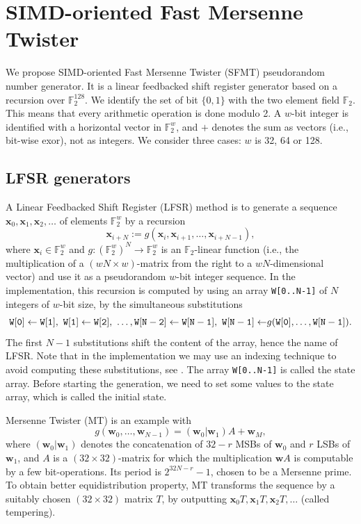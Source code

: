 \documentclass[acmnow]{acmtrans2m}
\def\F2{{\mathbb F}_2}
\def\bx{{{\mathbf x}}}
\def\bw{{{\mathbf w}}}
\begin{document}
\section{SIMD-oriented Fast Mersenne Twister}\label{sec:jump}

We propose SIMD-oriented Fast Mersenne Twister (SFMT) 
pseudorandom number generator. It is a
linear feedbacked shift register generator based
on a recursion over $\F2^{128}$.
We identify
the set of bit $\{0,1\}$
with the two element field $\F2$. This means that
every arithmetic operation is done modulo 2. 
A $w$-bit integer is identified with 
a horizontal vector in $\F2^{w}$, and 
$+$ denotes the sum as vectors (i.e., 
bit-wise exor), not as integers.
We consider three cases: $w$ is 32, 64 or 128.

\subsection{LFSR generators}
A Linear Feedbacked 
Shift Register (LFSR) method is to generate
a sequence $\bx_0, \bx_1, \bx_2, \ldots$
of elements $\F2^{w}$ by a recursion
\begin{equation}\label{eq:recursion}
\bx_{i+N}:=g(\bx_i, \bx_{i+1}, \ldots, \bx_{i+N-1}),
\end{equation}
where $\bx_i \in \F2^{w}$ and 
$g:(\F2^{w})^N \to \F2^{w}$ is an $\F2$-linear function
(i.e., the multiplication of a $(wN \times w)$-matrix 
from the right to a $wN$-dimensional vector)
and use it as a pseudorandom $w$-bit integer sequence.
In the implementation, this recursion is computed
by using an array {\tt W[0..N-1]} of $N$ integers of $w$-bit size,
by the simultaneous substitutions
$$
{\tt
W[0] \leftarrow W[1],\ 
W[1] \leftarrow W[2],\  \ldots,
W[N-2] \leftarrow W[N-1],\  
W[N-1] \leftarrow} g({\tt W[0]},\ldots,{\tt W[N-1]}). 
$$
The first $N-1$ substitutions shift the content of 
the array, hence the name of LFSR. 
Note that in the implementation we may use 
an indexing technique to avoid
computing these substitutions, see \cite[P.28 Algorithm A]{knuth:bible}.
The array {\tt W[0..N-1]} is called the state array.
Before starting the generation, we need to 
set some values to the state array, 
which is called the initial state. 

Mersenne Twister (MT) \cite{MT}
is an example with
$$
g(\bw_0,\ldots,\bw_{N-1})=(\bw_0|\bw_1)A + \bw_M,
$$
where $(\bw_0|\bw_1)$ denotes
the concatenation of 
$32-r$ MSBs of $\bw_0$ and $r$ LSBs of $\bw_1$,
and $A$ is a $(32\times 32)$-matrix 
for which the multiplication $\bw A$ is computable 
by a few bit-operations.
Its period is $2^{32N-r}-1$, chosen to be a Mersenne prime.
To obtain better equidistribution property, 
MT transforms the sequence by
a suitably chosen $(32\times 32)$ matrix $T$,
by outputting
$\bx_0T , \bx_1T, \bx_2T, \ldots$
(called tempering).
\end{document}
